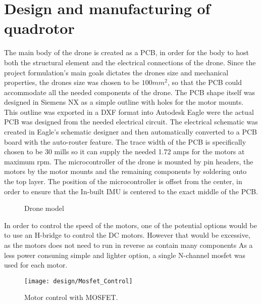 \section{Design and manufacturing of quadrotor}

The main body of the drone is created as a PCB, in order for the body to host both the structural element and the electrical connections of the drone. Since the project formulation’s main goals dictates the drones size and mechanical properties, the drones size was chosen to be $100 mm^2$, so that the PCB could accommodate all the needed components of the drone. The PCB shape itself was designed in Siemens NX as a simple outline with holes for the motor mounts. This outline was exported in a DXF format into Autodesk Eagle were the actual PCB was designed from the needed electrical circuit. The electrical schematic was created in Eagle’s schematic designer and then automatically converted to a PCB board with the auto-router feature. The trace width of the PCB is specifically chosen to be 30 mills so it can supply the needed 1.72 amps \cite{PCBTracewidth} for the motors at maximum rpm. The microcontroller of the drone is mounted by pin headers, the motors by the motor mounts and the remaining components by soldering onto the top layer. The position of the microcontroller is offset from the center, in order to ensure that the In-built IMU is centered to the exact middle of the PCB.

\begin{figure}[H]%
    \centering
    \qquad
    \caption{Drone model}%
    \label{fig:example}%
\end{figure}

In order to control the speed of the motors, one of the potential options would be to use an H-bridge to control
the DC motors. However that would be excessive, as the motors does not need to run in reverse as contain many components
As a less power consuning simple and lighter option, a single N-channel mosfet was used for each motor.

\begin{figure}[H]
    \begin{center}
    \texttt{[image: design/Mosfet\_Control]}
    \end{center}
    \caption{Motor control with MOSFET.}
    \label{fig:Mosfet_Control}
\end{figure}

